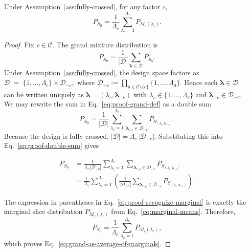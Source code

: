 \begin{corollary}
\label{cor:grand-as-average-of-marginals}
Under Assumption~\ref{ass:fully-crossed}, for any factor \(c\),
\begin{equation}
\label{eq:grand-as-average-of-marginals}
P_{S_0}
=
\frac{1}{\Lambda_c}
\sum_{\lambda_c=1}^{\Lambda_c}
P_{M_c(\lambda_c)}.
\end{equation}
\end{corollary}

\begin{proof}
Fix \(c \in \mathcal{C}\). The grand mixture distribution is
\begin{equation}
\label{eq:proof-grand-def}
P_{S_0}
=
\frac{1}{|\mathcal{D}|}
\sum_{\boldsymbol{\lambda}\in\mathcal{D}}
P_{S_{\boldsymbol{\lambda}}}.
\end{equation}
Under Assumption~\ref{ass:fully-crossed}, the design space factors as
\(
\mathcal{D} \;=\; \{1,\dots,\Lambda_c\}\times \mathcal{D}_{-c},
\)
where
\(
\mathcal{D}_{-c} := \prod_{d\in\mathcal{C}\setminus\{c\}}\{1,\dots,\Lambda_d\}.
\)
Hence each \(\boldsymbol{\lambda}\in\mathcal{D}\) can be written uniquely as
\(\boldsymbol{\lambda}=(\lambda_c,\boldsymbol{\lambda}_{-c})\) with
\(\lambda_c\in\{1,\dots,\Lambda_c\}\) and \(\boldsymbol{\lambda}_{-c}\in\mathcal{D}_{-c}\).
We may rewrite the sum in Eq.~\eqref{eq:proof-grand-def} as a double sum
\begin{equation}
\label{eq:proof-double-sum}
P_{S_0}
=
\frac{1}{|\mathcal{D}|}
\sum_{\lambda_c=1}^{\Lambda_c}
\sum_{\boldsymbol{\lambda}_{-c}\in\mathcal{D}_{-c}}
P_{S_{(\lambda_c,\boldsymbol{\lambda}_{-c})}}.
\end{equation}
Because the design is fully crossed,
\(
|\mathcal{D}| = \Lambda_c \, |\mathcal{D}_{-c}|.
\)
Substituting this into Eq.~\eqref{eq:proof-double-sum} gives

{\small
\begin{align}
P_{S_0}
&=
\frac{1}{\Lambda_c\,|\mathcal{D}_{-c}|}
\sum_{\lambda_c=1}^{\Lambda_c}
\sum_{\boldsymbol{\lambda}_{-c}\in\mathcal{D}_{-c}}
P_{S_{(\lambda_c,\boldsymbol{\lambda}_{-c})}}
\label{eq:proof-factor-cardinality}\\[4pt]
&=
\frac{1}{\Lambda_c}
\sum_{\lambda_c=1}^{\Lambda_c}
\left(
\frac{1}{|\mathcal{D}_{-c}|}
\sum_{\boldsymbol{\lambda}_{-c}\in\mathcal{D}_{-c}}
P_{S_{(\lambda_c,\boldsymbol{\lambda}_{-c})}}
\right).
\label{eq:proof-recognize-marginal}
\end{align}
}

The expression in parentheses in Eq.~\eqref{eq:proof-recognize-marginal} is
exactly the marginal slice distribution \(P_{M_c(\lambda_c)}\) from
Eq.~\eqref{eq:marginal-means}. Therefore,
\[
P_{S_0}
=
\frac{1}{\Lambda_c}
\sum_{\lambda_c=1}^{\Lambda_c}
P_{M_c(\lambda_c)},
\]
which proves Eq.~\eqref{eq:grand-as-average-of-marginals}.
\end{proof}



